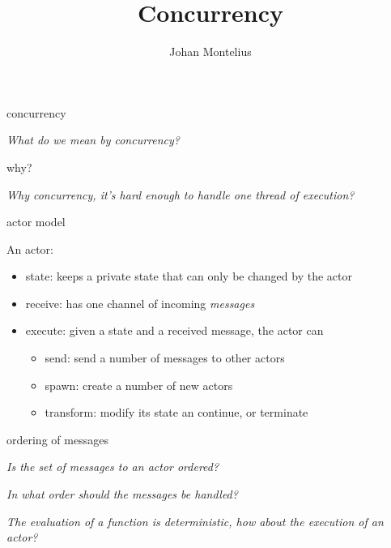 

\title[ID1019 Concurrency]{Concurrency}

\author{Johan Montelius}
\date{\semester}



\begin{frame}
\titlepage
\end{frame}

\begin{frame}[fragile]{concurrency}

{\em What do we mean by concurrency?}


\end{frame}


\begin{frame}{why?}

{\em Why concurrency, it's hard enough to handle one thread of execution?} 

\end{frame}

\begin{frame}{actor model}

An actor:
\begin{itemize}
\item state: keeps a private state that can only be changed by the actor
\pause
\item receive: has one channel of incoming {\em messages}
\pause
\item execute: given a state and a received message, the actor can
\begin{itemize}
\pause
\item send: send a number of messages to other actors
\pause
\item spawn: create a number of new actors
\pause
\item transform: modify its state an continue, or terminate
\end{itemize}
\end{itemize}

\end{frame}


\begin{frame}{ordering of messages}

{\em Is the set of messages to an actor ordered?}

\pause\vspace{20pt}
{\em In what order should the messages be handled?}

\pause\vspace{20pt}
{\em The evaluation of a function is deterministic, how about the execution of an actor?}


\end{frame}


